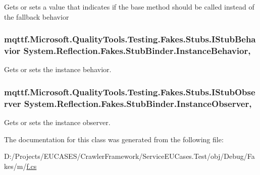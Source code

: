 Gets or sets a value that indicates if the base method should be called instead of the fallback behavior

\hypertarget{class_system_1_1_reflection_1_1_fakes_1_1_stub_binder_a992eacd7ac5d72c5f5107b23f32531fa}{
\subsubsection[{Instance\-Behavior}]{\setlength{\rightskip}{0pt plus 5cm}mqttf.\-Microsoft.\-Quality\-Tools.\-Testing.\-Fakes.\-Stubs.\-I\-Stub\-Behavior System.\-Reflection.\-Fakes.\-Stub\-Binder.\-Instance\-Behavior\hspace{0.3cm}{\ttfamily [get]}, {\ttfamily [set]}}}\label{class_system_1_1_reflection_1_1_fakes_1_1_stub_binder_a992eacd7ac5d72c5f5107b23f32531fa}


Gets or sets the instance behavior.

\hypertarget{class_system_1_1_reflection_1_1_fakes_1_1_stub_binder_a75993d1cd02bd4398dc394d1308eabe1}{
\subsubsection[{Instance\-Observer}]{\setlength{\rightskip}{0pt plus 5cm}mqttf.\-Microsoft.\-Quality\-Tools.\-Testing.\-Fakes.\-Stubs.\-I\-Stub\-Observer System.\-Reflection.\-Fakes.\-Stub\-Binder.\-Instance\-Observer\hspace{0.3cm}{\ttfamily [get]}, {\ttfamily [set]}}}\label{class_system_1_1_reflection_1_1_fakes_1_1_stub_binder_a75993d1cd02bd4398dc394d1308eabe1}


Gets or sets the instance observer.



The documentation for this class was generated from the following file\-:\begin{DoxyCompactItemize}
\item 
D\-:/\-Projects/\-E\-U\-C\-A\-S\-E\-S/\-Crawler\-Framework/\-Service\-E\-U\-Cases.\-Test/obj/\-Debug/\-Fakes/m/\hyperlink{m_2f_8cs}{f.\-cs}\end{DoxyCompactItemize}

